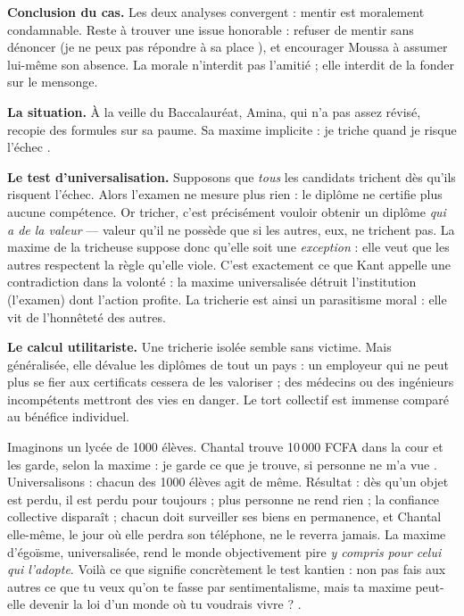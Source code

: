 \documentclass[11pt]{article}
\newcommand{\cle}[1]{{\popxbold\color{popdark}#1}}
\newcounter{popsec}
\newcounter{popsub}
\newcommand{\courssub}[1]{%
  \stepcounter{popsub}%
  \par\vspace{9pt}\noindent{\popxbold\fontsize{11.5}{13}\selectfont\color{popink}{\color{poporange}\thepopsec.\thepopsub}\hspace{6pt}#1}\par\nopagebreak\vspace{4pt}
}
\begin{document}
\textbf{Conclusion du cas.} Les deux analyses convergent : mentir est moralement condamnable. Reste à trouver une issue honorable : refuser de mentir sans dénoncer (\guillemotleft je ne peux pas répondre à sa place \guillemotright), et encourager Moussa à assumer lui-même son absence. La morale n'interdit pas l'amitié ; elle interdit de la fonder sur le mensonge.

\courssub{Étude de cas 2 : la tricherie à l'examen}

\textbf{La situation.} À la veille du Baccalauréat, Amina, qui n'a pas assez révisé, recopie des formules sur sa paume. Sa maxime implicite : \guillemotleft je triche quand je risque l'échec \guillemotright.

\textbf{Le test d'universalisation.} Supposons que \emph{tous} les candidats trichent dès qu'ils risquent l'échec. Alors l'examen ne mesure plus rien : le diplôme ne certifie plus aucune compétence. Or tricher, c'est précisément vouloir obtenir un diplôme \emph{qui a de la valeur} — valeur qu'il ne possède que si les autres, eux, ne trichent pas. La maxime de la tricheuse suppose donc qu'elle soit une \emph{exception} : elle veut que les autres respectent la règle qu'elle viole. C'est exactement ce que Kant appelle une contradiction dans la volonté : la maxime universalisée détruit l'institution (l'examen) dont l'action profite. La tricherie est ainsi un \cle{parasitisme moral} : elle vit de l'honnêteté des autres.

\textbf{Le calcul utilitariste.} Une tricherie isolée semble sans victime. Mais généralisée, elle dévalue les diplômes de tout un pays : un employeur qui ne peut plus se fier aux certificats cessera de les valoriser ; des médecins ou des ingénieurs incompétents mettront des vies en danger. Le tort collectif est immense comparé au bénéfice individuel.

\begin{exemplebox}
Imaginons un lycée de 1000 élèves. Chantal trouve 10\,000 FCFA dans la cour et les garde, selon la maxime : \guillemotleft je garde ce que je trouve, si personne ne m'a vue \guillemotright. Universalisons : chacun des 1000 élèves agit de même. Résultat : dès qu'un objet est perdu, il est perdu pour toujours ; plus personne ne rend rien ; la confiance collective disparaît ; chacun doit surveiller ses biens en permanence, et Chantal elle-même, le jour où elle perdra son téléphone, ne le reverra jamais. La maxime d'égoïsme, universalisée, rend le monde objectivement pire \emph{y compris pour celui qui l'adopte}. Voilà ce que signifie concrètement le test kantien : non pas \guillemotleft fais aux autres ce que tu veux qu'on te fasse \guillemotright par sentimentalisme, mais \guillemotleft ta maxime peut-elle devenir la loi d'un monde où tu voudrais vivre ? \guillemotright.
\end{exemplebox}
\end{document}
